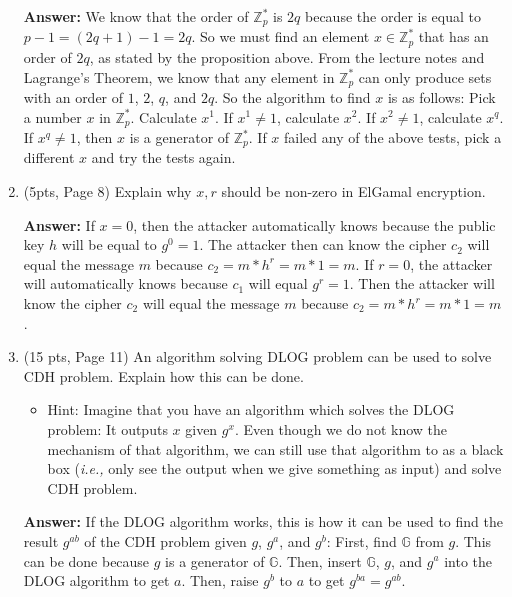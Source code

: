 \documentclass[10pt]{article}
\begin{document}
\begin{enumerate}
	\textbf{Answer:} \newline We know that the order of $\mathbb{Z}_p^*$ is $2q$ because the order is equal to $p-1=(2q+1)-1=2q$. So we must find an element $x\in\mathbb{Z}_p^*$ that has an order of $2q$, as stated by the proposition above. From the lecture notes and Lagrange's Theorem, we know that any element in $\mathbb{Z}_p^*$ can only produce sets with an order of $1$, $2$, $q$, and $2q$. So the algorithm to find $x$ is as follows: \newline \newline Pick a number $x$ in $\mathbb{Z}_p^*$. \newline Calculate $x^1$. \newline If $x^1\ne1$, calculate $x^2$. \newline If $x^2\ne1$, calculate $x^q$. \newline If $x^q\ne1$, then $x$ is a generator of $\mathbb{Z}_p^*$. \newline If $x$ failed any of the above tests, pick a different $x$ and try the tests again. 
	
	\bigskip\item (5pts, Page 8) Explain why $x,r$ should be non-zero in ElGamal encryption.
	
	\textbf{Answer:} \newline If $x=0$, then the attacker automatically knows because the public key $h$ will be equal to $g^0=1$. The attacker then can know the cipher $c_2$ will equal the message $m$ because $c_2=m*h^r=m*1=m$. \newline If $r=0$, the attacker will automatically knows because $c_1$ will equal $g^r=1$. Then the attacker will know the cipher $c_2$ will equal the message $m$ because $c_2=m*h^r=m*1=m$. 
	
	\bigskip\item (15 pts, Page 11) An algorithm solving DLOG problem can be used to solve CDH problem. Explain how this can be done.
	\begin{itemize}
		\item Hint: Imagine that you have an algorithm which solves the DLOG problem: It outputs $x$ given $g^x$. Even though we do not know the mechanism of that algorithm, we can still use that algorithm to as a black box (\textit{i.e.,} only see the output when we give something as input) and solve CDH problem.
	\end{itemize}
	
	
	\textbf{Answer:} \newline If the DLOG algorithm works, this is how it can be used to find the result $g^{ab}$ of the CDH problem given $g$, $g^a$, and $g^b$: \newline First, find $\mathbb{G}$ from $g$. This can be done because $g$ is a generator of $\mathbb{G}$. \newline Then, insert $\mathbb{G}$, $g$, and $g^a$ into the DLOG algorithm to get $a$. \newline Then, raise $g^b$ to $a$ to get $g^{ba}=g^{ab}$.
	

\end{enumerate}
\end{document}
